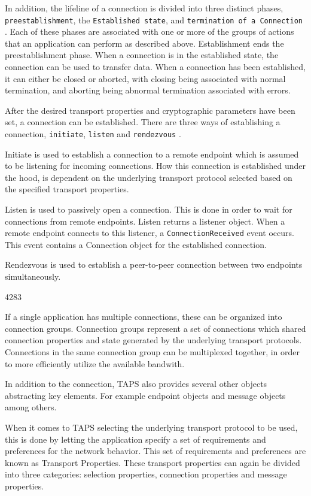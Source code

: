 In addition, the lifeline of a connection is divided into three distinct
phases, \texttt{preestablishment}, the \texttt{Established state}, and 
\texttt{termination of a Connection} \cite{paulyArchitectureRequirementsTransport2025}.
Each of these phases are associated
with one or more of the groups of actions that an application can perform
as described above. Establishment ends the preestablishment phase. When a
connection is in the established state, the connection can be used to
transfer data. When a connection has been established, it can either
be closed or aborted, with closing being associated with normal termination,
and aborting being abnormal termination associated with errors.

After the desired transport properties and cryptographic parameters have
been set, a connection can be established. There are three ways of
establishing a connection, \texttt{initiate}, \texttt{listen} and
\texttt{rendezvous} \cite{paulyArchitectureRequirementsTransport2025}.

Initiate is used to establish a connection to a remote endpoint which
is assumed to be listening for incoming connections. How this connection
is established under the hood, is dependent on the underlying transport
protocol selected based on the specified transport properties.

Listen is used to passively open a connection. This is done in order to
wait for connections from remote endpoints. Listen returns a listener
object. When a remote endpoint connects to this listener, a \texttt{ConnectionReceived}
event occurs. This event contains a Connection object for the 
established connection.

Rendezvous is used to establish a peer-to-peer connection between two endpoints
simultaneously.

4283


If a single application has multiple connections, these can be organized
into connection groups. Connection groups represent a set of connections
which shared connection properties and state generated by the underlying
transport protocols. Connections in the same connection group can be
multiplexed together, in order to more efficiently utilize the available
bandwith.

In addition to the connection, TAPS also provides several other objects
abstracting key elements. For example endpoint objects and message objects
among others.

When it comes to TAPS selecting the underlying transport protocol to
be used, this is done by
letting the application specify a set of requirements
and preferences for the network behavior. This set of requirements
and preferences are known as Transport Properties. These transport
properties can again be divided into three categories: selection
properties, connection properties and message properties. 


